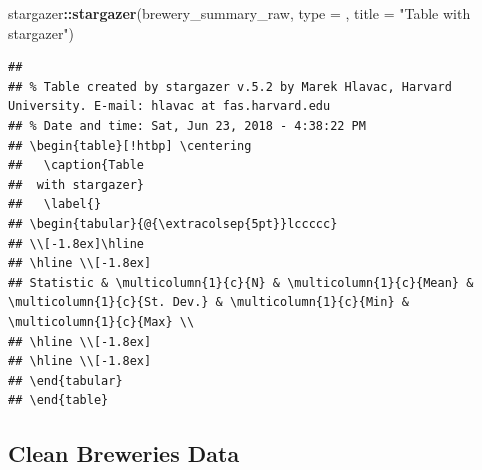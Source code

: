 \documentclass[]{article}
\newenvironment{Shaded}{\begin{snugshade}}{\end{snugshade}}
\newcommand{\KeywordTok}[1]{\textcolor[rgb]{0.13,0.29,0.53}{\textbf{#1}}}
\newcommand{\DataTypeTok}[1]{\textcolor[rgb]{0.13,0.29,0.53}{#1}}
\newcommand{\StringTok}[1]{\textcolor[rgb]{0.31,0.60,0.02}{#1}}
\newcommand{\OperatorTok}[1]{\textcolor[rgb]{0.81,0.36,0.00}{\textbf{#1}}}
\newcommand{\NormalTok}[1]{#1}
\begin{document}
\begin{Shaded}
\begin{Highlighting}[]
\NormalTok{stargazer}\OperatorTok{::}\KeywordTok{stargazer}\NormalTok{(brewery_summary_raw, }\DataTypeTok{type =}\NormalTok{ , }\DataTypeTok{title =} \StringTok{"Table}
\StringTok{ with stargazer"}\NormalTok{)}
\end{Highlighting}
\end{Shaded}

\begin{verbatim}
## 
## % Table created by stargazer v.5.2 by Marek Hlavac, Harvard University. E-mail: hlavac at fas.harvard.edu
## % Date and time: Sat, Jun 23, 2018 - 4:38:22 PM
## \begin{table}[!htbp] \centering 
##   \caption{Table
##  with stargazer} 
##   \label{} 
## \begin{tabular}{@{\extracolsep{5pt}}lccccc} 
## \\[-1.8ex]\hline 
## \hline \\[-1.8ex] 
## Statistic & \multicolumn{1}{c}{N} & \multicolumn{1}{c}{Mean} & \multicolumn{1}{c}{St. Dev.} & \multicolumn{1}{c}{Min} & \multicolumn{1}{c}{Max} \\ 
## \hline \\[-1.8ex] 
## \hline \\[-1.8ex] 
## \end{tabular} 
## \end{table}
\end{verbatim}

\subsection{Clean Breweries Data}\label{clean-breweries-data}
\end{document}
